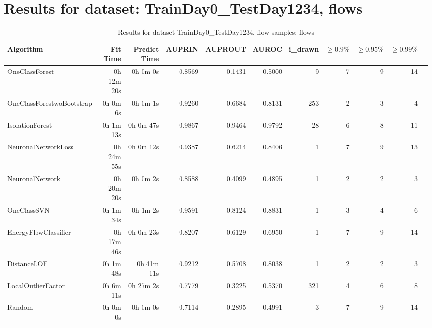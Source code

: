 \documentclass{article}
\begin{document}
\section*{Results for dataset: TrainDay0_TestDay1234, flows}
\begin{table}[h!]
\centering
\caption{Results for dataset TrainDay0_TestDay1234, flow samples: flows}
\begin{tabular}{lrrrrrrrrrr}
\toprule
Algorithm & Fit Time & Predict Time & AUPRIN & AUPROUT & AUROC & i\_drawn & $\geq 0.9\%$ & $\geq 0.95\%$ & $\geq 0.99\%$ \\
\midrule
OneClassForest & 0h 12m 20s & 0h 0m 0s & 0.8569 & 0.1431 & 0.5000 & 9 & 7 & 9 & 14 \\
OneClassForestwoBootstrap & 0h 0m 6s & 0h 0m 1s & 0.9260 & 0.6684 & 0.8131 & 253 & 2 & 3 & 4 \\
IsolationForest & 0h 1m 13s & 0h 0m 47s & 0.9867 & 0.9464 & 0.9792 & 28 & 6 & 8 & 11 \\
NeuronalNetworkLoss & 0h 24m 55s & 0h 0m 12s & 0.9387 & 0.6214 & 0.8406 & 1 & 7 & 9 & 13 \\
NeuronalNetwork & 0h 20m 20s & 0h 0m 2s & 0.8588 & 0.4099 & 0.4895 & 1 & 2 & 2 & 3 \\
OneClassSVN & 0h 1m 34s & 0h 1m 2s & 0.9591 & 0.8124 & 0.8831 & 1 & 3 & 4 & 6 \\
EnergyFlowClassifier & 0h 17m 46s & 0h 0m 23s & 0.8207 & 0.6129 & 0.6950 & 1 & 7 & 9 & 14 \\
DistanceLOF & 0h 1m 48s & 0h 41m 11s & 0.9212 & 0.5708 & 0.8038 & 1 & 2 & 2 & 3 \\
LocalOutlierFactor & 0h 6m 11s & 0h 27m 2s & 0.7779 & 0.3225 & 0.5370 & 321 & 4 & 6 & 8 \\
Random & 0h 0m 0s & 0h 0m 0s & 0.7114 & 0.2895 & 0.4991 & 3 & 7 & 9 & 14 \\
\bottomrule
\end{tabular}
\end{table}
\end{document}
